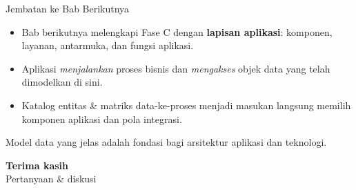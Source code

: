 \documentclass[aspectratio=169, table]{beamer}
\newcommand{\takeaway}[1]{%
  \vspace{4pt}
  {\footnotesize #1}
}
\begin{document}
\begin{frame}{Jembatan ke Bab Berikutnya}
  \vspace{8pt}
  \begin{itemize}
    \item Bab berikutnya melengkapi Fase C dengan \textbf{lapisan aplikasi}:
          komponen, layanan, antarmuka, dan fungsi aplikasi.
    \item Aplikasi \emph{menjalankan} proses bisnis dan \emph{mengakses} objek
          data yang telah dimodelkan di sini.
    \item Katalog entitas \& matriks data-ke-proses menjadi masukan langsung
          memilih komponen aplikasi dan pola integrasi.
  \end{itemize}
  \takeaway{Model data yang jelas adalah fondasi bagi arsitektur aplikasi dan
  teknologi.}
\end{frame}

\begin{frame}{\hfill}
  \centering
  \Huge{\textbf{Terima kasih}}\\[8pt]
  \normalsize Pertanyaan \& diskusi
\end{frame}
\end{document}
